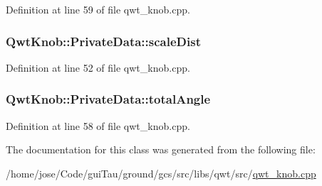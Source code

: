 Definition at line 59 of file qwt\-\_\-knob.\-cpp.

\hypertarget{class_qwt_knob_1_1_private_data_a6b114957cd7f390ab3dbbec9584c478e}{
\subsubsection[{scale\-Dist}]{ Qwt\-Knob\-::\-Private\-Data\-::scale\-Dist}}\label{class_qwt_knob_1_1_private_data_a6b114957cd7f390ab3dbbec9584c478e}


Definition at line 52 of file qwt\-\_\-knob.\-cpp.

\hypertarget{class_qwt_knob_1_1_private_data_a5581c49be956d833c90b5998fcb4d641}{
\subsubsection[{total\-Angle}]{ Qwt\-Knob\-::\-Private\-Data\-::total\-Angle}}\label{class_qwt_knob_1_1_private_data_a5581c49be956d833c90b5998fcb4d641}


Definition at line 58 of file qwt\-\_\-knob.\-cpp.



The documentation for this class was generated from the following file\-:\begin{DoxyCompactItemize}
\item 
/home/jose/\-Code/gui\-Tau/ground/gcs/src/libs/qwt/src/\hyperlink{qwt__knob_8cpp}{qwt\-\_\-knob.\-cpp}\end{DoxyCompactItemize}
